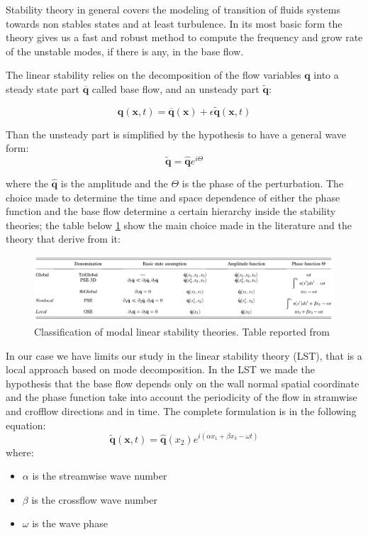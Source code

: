 Stability theory in general covers the modeling of transition of fluids systems towards non stables states and at least turbulence.
In its most basic form the theory gives us a fast and robust method to compute the frequency and grow rate of the unstable modes, if there is any, in the base flow.

The linear stability relies on the decomposition of the flow variables $\mathbf{q}$ into a steady state part $\overline{\mathbf{q}}$ called base flow, and an unsteady part $\widetilde{\mathbf{q}}$:

$$ \mathbf{q} (\mathbf{x},t)= \overline{\mathbf{q}} (\mathbf{x}) + \epsilon \widetilde{\mathbf{q}} (\mathbf{x},t) $$

Than the unsteady part is simplified by the hypothesis to have a general wave form:
$$  \widetilde{\mathbf{q}} =  \widehat{\mathbf{q}} e^{i\Theta} $$

where the $\widehat{\mathbf{q}}$ is the amplitude and the $\Theta$ is the phase of the perturbation.
The choice made to determine the time and space dependence of either the phase function and the base flow determine a certain hierarchy inside the stability theories; the table below \ref{fig:table} show the main choice made in the literature and the theory that derive from it:

\begin{figure}[h]
	\centering
	\includegraphics[width=1\linewidth]{chapter_1/table}
	\caption{Classification of modal linear stability theories. Table reported from \citet{juniper2014modal}}
	\label{fig:table}
\end{figure}
 
In our case we have limits our study in the linear stability theory (LST), that is a local approach based on mode decomposition.
In the LST we made the hypothesis that the base flow depends only on the wall normal spatial coordinate and the phase function take into account the periodicity of the flow in stramwise and crofflow directions and in time.
The complete formulation is in the following equation:
 $$  \widetilde{\mathbf{q}}(\mathbf{x},t) =  \widehat{\mathbf{q}}(x_2) e^{i(\alpha x_1 + \beta x_3 - \omega t)}  $$ 
where:
\begin{itemize}
	\item $\alpha$ is the streamwise wave number
	\item $\beta$ is the crossflow wave number
	\item $\omega$ is the wave phase
\end{itemize}

